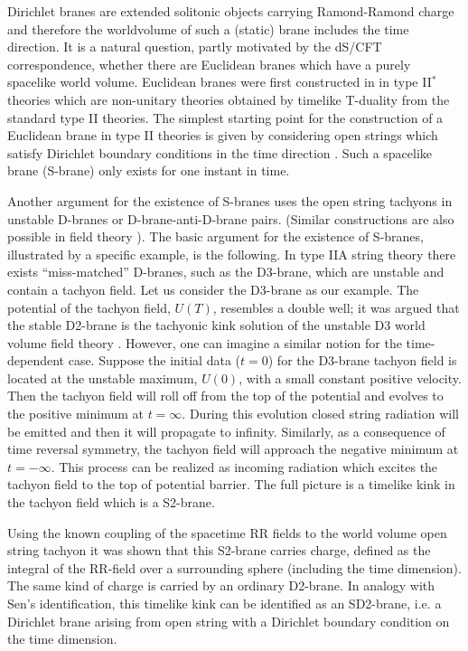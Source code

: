\documentclass[a4paper,aps,nofootinbib,showpacs,preprint]{revtex4}
\begin{document}
Dirichlet branes \cite{Po95} are extended solitonic objects
carrying Ramond-Ramond charge and therefore the worldvolume of
such a (static) brane includes the time direction. It is a natural
question, partly motivated by the dS/CFT correspondence, whether
there are Euclidean branes which have a purely spacelike world
volume. Euclidean branes were first constructed in
\cite{Hu98,Hu01} in type II$^*$ theories which are non-unitary
theories obtained by timelike T-duality from the standard type II
theories. The simplest starting point for the construction of a
Euclidean brane in type II theories is given by considering open
strings which satisfy Dirichlet boundary conditions in the time
direction \cite{GS02}. Such a spacelike brane (S-brane) only
exists for one instant in time.

Another argument for the existence of S-branes uses the open
string tachyons in unstable D-branes or D-brane-anti-D-brane
pairs. (Similar constructions are also possible in field theory
\cite{FGGRS95}). The basic argument for the existence of S-branes,
illustrated by a specific example, is the following. In type IIA
string theory there exists ``miss-matched'' D-branes, such as the
D3-brane, which are unstable and contain a tachyon field. Let us
consider the D3-brane as our example. The potential of the tachyon
field, $U(T)$, resembles a double well; it was argued that the
stable D2-brane is the tachyonic kink solution of the unstable D3
world volume field theory \cite{Se99}. However, one can imagine a
similar notion for the time-dependent case. Suppose the initial
data ($t=0$) for the D3-brane tachyon field is located at the
unstable maximum, $U(0)$, with a small constant positive velocity.
Then the tachyon field will roll off from the top of the potential
and evolves to the positive minimum at $t=\infty$. During this
evolution closed string radiation will be emitted and then it will
propagate to infinity. Similarly, as a consequence of time
reversal symmetry, the tachyon field will approach the negative
minimum at $t=-\infty$. This process can be realized as incoming
radiation which excites the tachyon field to the top of potential
barrier. The full picture is a timelike kink in the tachyon field
which is a S2-brane.

Using the known coupling of the spacetime RR fields to the world
volume open string tachyon it was shown that this S2-brane carries
charge, defined as the integral of the RR-field over a surrounding
sphere (including the time dimension). The same kind of charge is
carried by an ordinary D2-brane. In analogy with Sen's
identification, this timelike kink can be identified as an
SD2-brane, i.e. a Dirichlet brane arising from open string with a
Dirichlet boundary condition on the time dimension.
\end{document}
